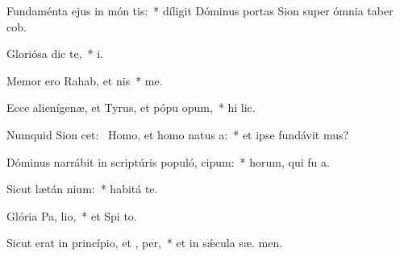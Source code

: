 \item Fundaménta ejus in món tis:~* díligit Dóminus portas Sion super ómnia taber cob.
\item Gloriósa dic   te,~*  i.
\item Memor ero Rahab, et nis~*  me.
\item Ecce alienígenæ, et Tyrus, et pópu opum,~* hi  lic.
\item Numquid Sion cet:~\pscross{} Homo, et homo natus   a:~* et ipse fundávit  mus?
\item Dóminus narrábit in scriptúris populó,  cipum:~* horum, qui fu  a.
\item Sicut lætán nium:~* habitá   te.
\item Glória Pa,  lio,~* et Spi to.
\item Sicut erat in princípio, et ,  per,~* et in sǽcula sæ. men.
